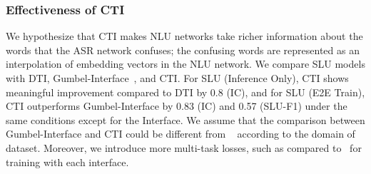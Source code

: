 \documentclass{article}
\begin{document}
\vspace{-4mm}
\subsubsection{Effectiveness of CTI}
We hypothesize that CTI makes NLU networks take richer information about the words that the ASR network confuses; the confusing words are represented as an interpolation of embedding vectors in the NLU network.
We compare SLU models with DTI, Gumbel-Interface~\cite{rao2021mean}, and CTI.
For SLU (Inference Only), CTI shows meaningful improvement compared to DTI by 0.8 (IC), and for SLU (E2E Train), CTI outperforms Gumbel-Interface by 0.83 (IC) and 0.57 (SLU-F1) under the same conditions except for the Interface.
We assume that the comparison between Gumbel-Interface and CTI could be different from ~\cite{saxon2021end} according to the domain of dataset.
Moreover, we introduce more multi-task losses, such as  compared to~\cite{saxon2021end} for training with each interface.
\end{document}
